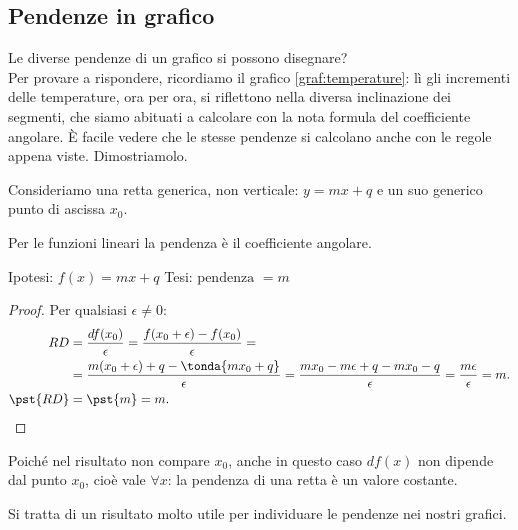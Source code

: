 \begin{comment}
Se \(\fstar[pendenza]\) è un numero finito e 
se \(\pst{\fstar[pendenza]}\) non dipende dal valore 
dell'\emph{infinitesimo diverso da zero} scelto, 
la parte standard ottenuta è proprio la pendenza della funzione nel punto.

Più facile da fare che da spiegare:
\end{comment}
\subsection{Pendenze in grafico}
\label{subsec:pendenze_grafico}
Le diverse pendenze di un grafico si possono disegnare? \\
Per provare a rispondere, ricordiamo il grafico \ref{graf:temperature}: lì gli 
incrementi delle temperature, ora per ora, si riflettono nella diversa 
inclinazione dei segmenti, che siamo abituati a calcolare con la nota formula 
del coefficiente angolare.  
È facile vedere che le stesse pendenze si calcolano anche con le 
regole appena viste. Dimostriamolo. 

Consideriamo una retta generica, non verticale: \(y=mx+q\) e un suo generico 
punto di ascissa \(x_0\).
\begin{teorema}
\label{teo:pendenza_retta}
  Per le funzioni lineari la pendenza è il coefficiente angolare.
\end{teorema}
\noindent Ipotesi: \(f(x)=mx+q\) \tab Tesi: \(\text{pendenza }=m\)
\begin{proof}
Per qualsiasi \(\epsilon\ne 0\):
\begin{align*}
RD &=\dfrac{df(x_0)}{\epsilon} =\dfrac{f(x_0+\epsilon)-f(x_0)}{\epsilon}=\\
               &=\dfrac{m(x_0+\epsilon)+q-\tonda{mx_0+q}}{\epsilon}=
                 \dfrac{mx_0-m\epsilon+q-mx_0-q}{\epsilon}=
                 \dfrac{m\epsilon}{\epsilon}=m.\\
\pst{RD}&= \pst{m}=m.
\end{align*}
\end{proof}
Poiché nel risultato non compare $x_0$, anche in questo caso $df(x)$ non 
dipende dal punto $x_0$, cioè vale \(\forall x\): la pendenza di una retta è un 
valore costante.

Si tratta di un risultato molto utile per individuare le pendenze nei 
nostri grafici. 


